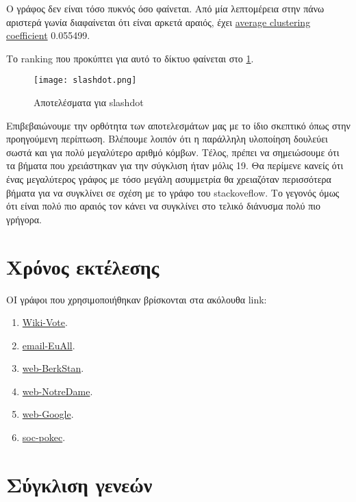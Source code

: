 Ο γράφος δεν είναι τόσο πυκνός όσο φαίνεται.
Από μία λεπτομέρεια στην πάνω αριστερά γωνία διαφαίνεται ότι είναι αρκετά αραιός,
έχει
\href{https://en.wikipedia.org/wiki/Clustering_coefficient#Global_clustering_coefficient}{average clustering coefficient} 0.055499.

Το ranking που προκύπτει για αυτό το δίκτυο φαίνεται στο
\hyperref[fig:slackres]{\figurename{} \ref{fig:slackres}}.
\begin{figure}[h!t]
	\centering
	\texttt{[image: slashdot.png]}
	\caption{Αποτελέσματα για slashdot}
	\label{fig:slackres}
\end{figure}
Επιβεβαιώνουμε την ορθότητα των αποτελεσμάτων μας με το ίδιο σκεπτικό όπως στην προηγούμενη περίπτωση.
Βλέπουμε λοιπόν ότι η παράλληλη υλοποίηση δουλεύει σωστά και για πολύ μεγαλύτερο αριθμό κόμβων.
Τέλος, πρέπει να σημειώσουμε ότι τα βήματα που χρειάστηκαν για την σύγκλιση ήταν μόλις 19.
Θα περίμενε κανείς ότι ένας μεγαλύτερος γράφος με τόσο μεγάλη ασυμμετρία θα χρειαζόταν περισσότερα βήματα για να συγκλίνει σε σχέση με το γράφο του stackoveflow.
Το γεγονός όμως ότι είναι πολύ πιο αραιός τον κάνει να συγκλίνει στο τελικό διάνυσμα πολύ πιο γρήγορα.
\clearpage
\section{Χρόνος εκτέλεσης}
ΟΙ γράφοι που χρησιμοποιήθηκαν βρίσκονται στα ακόλουθα link:\\
\begin{enumerate} 
	\item \href{https://snap.stanford.edu/data/wiki-Vote.html}{Wiki-Vote}.
	\item \href{https://snap.stanford.edu/data/email-EuAll.html}{email-EuAll}.
	\item\href{https://snap.stanford.edu/data/web-BerkStan.html}{web-BerkStan}.
	\item\href{https://snap.stanford.edu/data/web-NotreDame.html}{web-NotreDame}.
	\item\href{https://snap.stanford.edu/data/web-Google.html}{web-Google}.
	\item\href{https://snap.stanford.edu/data/soc-pokec.html}{soc-pokec}.
\end{enumerate}

\clearpage
\section{Σύγκλιση γενεών}